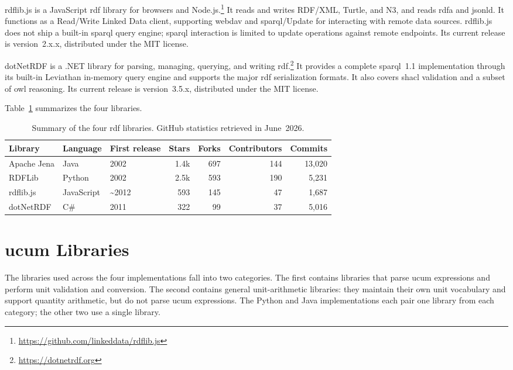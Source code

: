 rdflib.js is a JavaScript \ac{rdf} library for browsers and
Node.js.\footnote{\url{https://github.com/linkeddata/rdflib.js}} It reads and writes
RDF/XML, Turtle, and N3, and reads \ac{rdfa} and \ac{jsonld}. It functions as a
Read/Write Linked Data client, supporting \ac{webdav} and \ac{sparql}/Update for
interacting with remote data sources. rdflib.js does not ship a built-in \ac{sparql}
query engine; \ac{sparql} interaction is limited to update operations against remote
endpoints. Its current release is version~2.x.x, distributed under the MIT license.

dotNetRDF is a .NET library for parsing, managing, querying, and writing
\ac{rdf}.\footnote{\url{https://dotnetrdf.org}} It provides a complete \ac{sparql}~1.1
implementation through its built-in Leviathan in-memory query engine and supports the
major \ac{rdf} serialization formats. It also covers \ac{shacl} validation and a subset
of \ac{owl} reasoning. Its current release is version~3.5.x, distributed under the MIT
license.

Table~\ref{tab:rdf-libraries} summarizes the four libraries.

\begin{table}[h]
\centering
\caption{Summary of the four \ac{rdf} libraries. GitHub statistics retrieved in June~2026.}
\label{tab:rdf-libraries}
\begin{tabular}{lllrrrr}
\toprule
Library     & Language   & First release         & Stars & Forks & Contributors & Commits \\
\midrule
Apache Jena & Java       & 2002                  & 1.4k  & 697   & 144          & 13,020  \\
RDFLib      & Python     & 2002                  & 2.5k  & 593   & 190          & 5,231   \\
rdflib.js   & JavaScript & \textasciitilde{}2012 & 593   & 145   & 47           & 1,687   \\
dotNetRDF   & C\#        & 2011                  & 322   & 99    & 37           & 5,016   \\
\bottomrule
\end{tabular}
\end{table}

\section{\ac{ucum} Libraries}

The libraries used across the four implementations fall into two categories. The first
contains libraries that parse \ac{ucum} expressions and perform unit validation and
conversion. The second contains general unit-arithmetic libraries: they maintain their own
unit vocabulary and support quantity arithmetic, but do not parse \ac{ucum} expressions.
The Python and Java implementations each pair one library from each category; the other
two use a single library.

